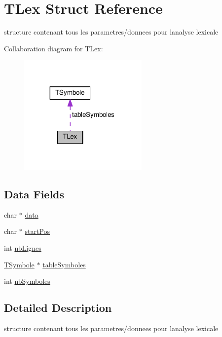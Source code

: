\hypertarget{structTLex}{}\section{T\+Lex Struct Reference}
\label{structTLex}


structure contenant tous les parametres/donnees pour l\textquotesingle{}analyse lexicale  




Collaboration diagram for T\+Lex\+:
\nopagebreak
\begin{figure}[H]
\begin{center}
\leavevmode
\includegraphics[width=179pt]{structTLex__coll__graph}
\end{center}
\end{figure}
\subsection*{Data Fields}
\begin{DoxyCompactItemize}
\item 
char $\ast$ \hyperlink{structTLex_a2242e630c3f871659c3e36b101b504b4}{data}
\item 
char $\ast$ \hyperlink{structTLex_a1122e1ced17c2c07f7975b4f11110ad8}{start\+Pos}
\item 
int \hyperlink{structTLex_a74499b75b25dc1bce1fb2f66af6ce1e2}{nb\+Lignes}
\item 
\hyperlink{structTSymbole}{T\+Symbole} $\ast$ \hyperlink{structTLex_a31a6c4fc0839643e3251a372ba7adf04}{table\+Symboles}
\item 
int \hyperlink{structTLex_a84d0d3a30f4b42f8db675f8cbb60373f}{nb\+Symboles}
\end{DoxyCompactItemize}


\subsection{Detailed Description}
structure contenant tous les parametres/donnees pour l\textquotesingle{}analyse lexicale 

